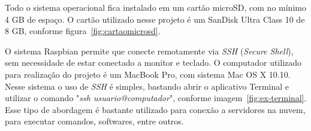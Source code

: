 \documentclass[
	12pt,				%
	openright,			%
	oneside,			%
	a4paper,			%
	chapter=TITLE,		%
	english,			%
	brazil				%
	]{abntex2}
\begin{document}
{Todo o sistema operacional fica instalado em um cartão microSD, com no mínimo 4 GB de espaço. O cartão utilizado nesse projeto é um SanDisk Ultra Class 10 de 8 GB, conforme figura~\ref{fig:cartaomicrosd}.

\begin{figure}[htb]
\end{figure}

O sistema Raspbian permite que conecte remotamente via \textit{SSH} (\textit{Secure Shell}), sem necessidade de estar conectado a monitor e teclado. O computador utilizado para realização do projeto é um MacBook Pro, com sistema Mac OS X 10.10. Nesse sistema o uso de \textit{SSH} é simples, bastando abrir o aplicativo Terminal e utilizar o comando "\textit{ssh usuario@computador}", conforme imagem~\ref{fig:ex-terminal}. Esse tipo de abordagem é bastante utilizado para conexão a servidores na nuvem, para executar comandos, softwares, entre outros.

\begin{figure}[htb]
\end{figure}

}
\end{document}
